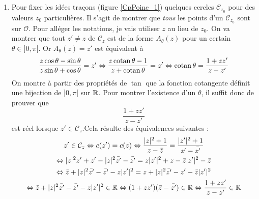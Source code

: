 \begin{enumerate}
\begin{enumerate}
\item Pour fixer les id{\'e}es tra\c{c}ons (figure \ref{CpPoinc_1}) quelques cercles $\mathcal{C}_{z_0}$ pour des valeurs $z_0$ particulières. Il s'agit de montrer que \emph{tous} les points d'un $\mathcal{C}_{z_0}$ sont sur $\mathcal{O}$.\newline
Pour all{\'e}ger les notations, je vais utiliser $z$ au lieu de $z_0$. On va montrer que tout $z'\neq z$ de $\mathcal{C}_z$ est de la forme $A_{\theta}(z)$ pour un certain $\theta \in ]0,\pi[ $.\newline
Or $A_{\theta}(z)=z'$ est {\'e}quivalent {\`a}
\begin{displaymath}
 \frac{z\cos \theta - \sin\theta}{z\sin \theta + \cos \theta} = z'
 \Leftrightarrow
 \frac{z\operatorname{cotan} \theta -1}{z + \operatorname{cotan} \theta} = z'
 \Leftrightarrow
 \operatorname{cotan} \theta=\frac{1+zz'}{z-z'}
\end{displaymath}
On montre {\`a} partir des propri{\'e}t{\'e}s de $\tan$ que la fonction cotangente d{\'e}finit une bijection de $]0,\pi[$ sur
$\mathbb{R}$. Pour montrer l'existence d'un $\theta$, il suffit donc de prouver que
\begin{displaymath}
 \frac{1+zz'}{z-z'}
\end{displaymath}
est r{\'e}el lorsque $z'\in\mathcal{C}_z$.\newline Cela r{\'e}sulte des {\'e}quivalences suivantes :
\begin{multline*}
z'\in\mathcal{C}_z \Leftrightarrow 
c(z')=c(z) \Leftrightarrow \frac{|z|^2+1}{z-\bar{z}}=\frac{|z'|^2+1}{z'-\bar{z'}} \\
 \Leftrightarrow 
|z|^2z'+z'-|z|^2\bar{z'}-\bar{z'}=z|z'|^2+z-\bar{z}|z'|^2-\bar{z}\\
\Leftrightarrow
\bar{z}+|z|^2\bar{z'}-\bar{z'}-z|z'|^2=z+|z|^2\bar{z'}-z'-\bar{z}|z'|^2\\
\Leftrightarrow
\bar{z}+|z|^2\bar{z'}-\bar{z'}-z|z'|^2 \in \mathbb{R}
 \Leftrightarrow  (1+zz')(\bar{z}-\bar{z'})\in \mathbb{R}
 \Leftrightarrow  \frac{1+zz'}{z-z'}\in \mathbb{R}
\end{multline*}
   \end{enumerate}
\end{enumerate}